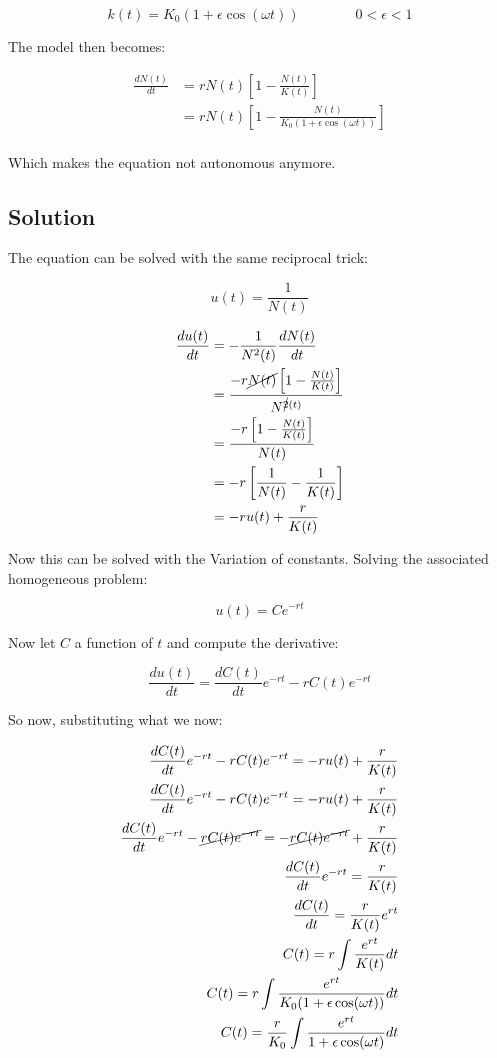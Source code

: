 $$k(t) = K_0(1+\epsilon\cos(\omega t))\qquad\qquad 0<\epsilon< 1$$

The model then becomes:

\begin{align*}
  \frac{dN(t)}{dt} &= rN(t)\left[1-\frac{N(t)}{K(t)}\right]\\
                   &= rN(t)\left[1-\frac{N(t)}{K_0(1+\epsilon\cos(\omega t))}\right]\\
\end{align*}

Which makes the equation not autonomous anymore.

  \subsection{Solution}
  The equation can be solved with the same reciprocal trick:

  $$u(t) = \frac{1}{N(t)}$$

  \begin{align*}
    \frac{du(t)}{dt} &= -\frac{1}{N^2(t)}\frac{dN(t)}{dt}\\
                     &= \frac{-r\cancel{N(t)}\left[1-\frac{N(t)}{K(t)}\right]}{N^{\cancel{2}(t)}}\\
                     &= \frac{-r\left[1-\frac{N(t)}{K(t)}\right]}{N(t)}\\
                     &= -r\left[\frac{1}{N(t)}-\frac{1}{K(t)}\right]\\
                     &= -ru(t) + \frac{r}{K(t)}\\
  \end{align*}

  Now this can be solved with the Variation of constants.
  Solving the associated homogeneous problem:

  $$u(t) = Ce^{-rt}$$

  Now let $C$ a function of $t$ and compute the derivative:

  $$\frac{du(t)}{dt} = \frac{dC(t)}{dt}e^{-rt} - rC(t)e^{-rt}$$

  So now, substituting what we now:

  \begin{align*}
    \frac{dC(t)}{dt}e^{-rt} - rC(t)e^{-rt} = -ru(t) + \frac{r}{K(t)}\\
    \frac{dC(t)}{dt}e^{-rt} - rC(t)e^{-rt} = -ru(t) + \frac{r}{K(t)}\\
    \frac{dC(t)}{dt}e^{-rt} - \cancel{rC(t)e^{-rt}} = -\cancel{rC(t)e^{-rt}} + \frac{r}{K(t)}\\
    \frac{dC(t)}{dt}e^{-rt} = \frac{r}{K(t)}\\
    \frac{dC(t)}{dt} = \frac{r}{K(t)}e^{rt}\\
    C(t) = r\int \frac{e^{rt}}{K(t)}dt\\
    C(t) = r\int \frac{e^{rt}}{K_0(1+\epsilon\cos(\omega t))}dt\\
    C(t) = \frac{r}{K_0}\int \frac{e^{rt}}{1+\epsilon\cos(\omega t)}dt\\
  \end{align*}

